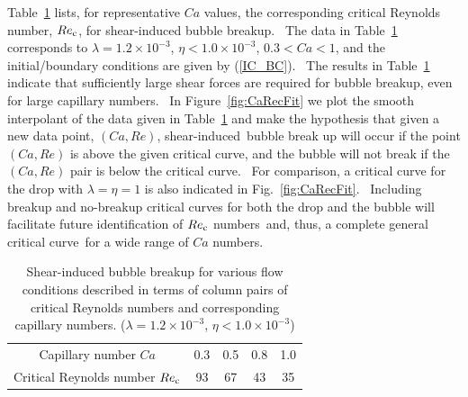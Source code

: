\documentclass{elsarticle}
\begin{document}
Table~\ref{tab:CaRecComparison} lists, for representative $Ca$ values, the corresponding critical Reynolds number, $Re_{\rm c}$, for shear-induced bubble breakup.  The data in Table~\ref{tab:CaRecComparison} corresponds to $\lambda = 1.2 \times 10^{-3}$, $\eta < 1.0 \times 10^{-3}$, $0.3<Ca<1$, and the initial/boundary conditions are given by (\ref{IC_BC}).  The results in Table~\ref{tab:CaRecComparison} indicate that sufficiently large shear forces are required for bubble breakup, even for large capillary numbers.  In Figure~\ref{fig:CaRecFit} we plot the smooth interpolant of the data given in Table~\ref{tab:CaRecComparison} and make the hypothesis that given a new data point, $(Ca,Re)$, shear-induced bubble break up will occur if the point $(Ca,Re)$ is above the given critical curve, and the bubble will not break if the $(Ca,Re)$ pair is below the critical curve.  For comparison, a critical curve for the drop with $\lambda =\eta = 1$ is also indicated in Fig.~\ref{fig:CaRecFit}.  Including breakup and no-breakup critical curves for both the drop and the bubble will facilitate future identification of $Re_{\rm c}$ numbers and, thus, a complete general critical curve for a wide range of $Ca$ numbers.


\begin{table}[tbh]
\caption{Shear-induced bubble breakup for various flow 
	conditions described in terms
        of column pairs of critical Reynolds numbers and 
	corresponding capillary numbers.
        ($\lambda = 1.2 \times 10^{-3}$, $\eta < 1.0 \times 10^{-3}$) 
	}
\label{tab:CaRecComparison}
\footnotesize
\center
\begin{tabular}{ c  c  c  c  c }
\hline
\hline
Capillary number $Ca$            & 0.3  & 0.5  & 0.8  & 1.0  \\
Critical Reynolds number $Re_{\rm c}$  & 93   & 67   & 43   & 35   \\
\hline
\hline
\end{tabular}
\end{table}
\end{document}
